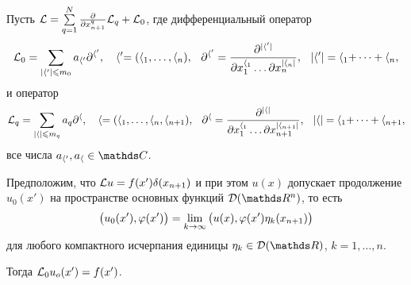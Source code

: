 \begin{The}
	Пусть $\L = \RY q1N\CP{ }{x_{n+1}^q}\L_q + \L_0$, где дифференциальный оператор
	\[
		\L_0 = \sum\limits_{|\a'|\le m_0}a_{\a'}\dl^{\a'},\quad \a' = (\a_1,\dots,\a_n),\pau \dl^{\a'} = \frac{\dl^{|\a'|}}{\dl x_1^{\a_1}\dots\dl x_n^{|\a_n|}},\pau |\a'| = \a_1+\dots+\a_n,
	\]
	и оператор
	\[
		\L_q = \sum\limits_{|\a|\le m_q}a_q \dl^\a,\quad \a = (\a_1,\dots,\a_n,\a_{n+1}),\pau \dl^{\a} = \frac{\dl^{|\a|}}{\dl x_1^{\a_1}\dots\dl x_{n+1}^{|\a_{n+1}|}},\pau |\a| = \a_1+\dots+\a_{n+1},
	\]
	все числа $a_{\a'},a_\a\in\C$.

	Предположим, что $\L u = f(x')\d(x_{n+1})$ и при этом $u(x)$ допускает продолжение $u_0(x')$ на пространстве основных функций $\D(\R^n)$, то есть 
	\[
		\big(u_0(x'),\phi(x')\big)= \yo k\infty\big(u(x),\phi(x')\eta_k(x_{n+1})\big)
	\]
	для любого компактного исчерпания единицы $\eta_k\in \D(\R)$, $k=1,\dots,n$.

	Тогда $\L_0 u_o(x') =f(x')$.
\end{The}
